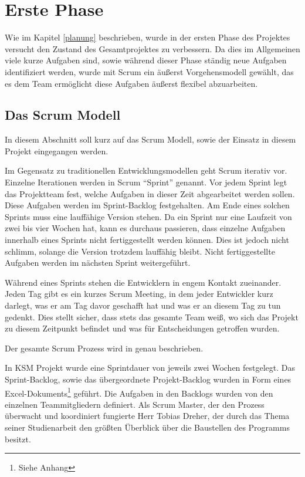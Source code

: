 \section{Erste Phase}

Wie im Kapitel \ref{planung} beschrieben, wurde in der ersten Phase des Projektes versucht den Zustand des Gesamtprojektes zu verbessern. Da dies im Allgemeinen viele kurze Aufgaben sind, sowie während dieser Phase ständig neue Aufgaben identifiziert werden, wurde mit Scrum ein äußerst Vorgehensmodell gewählt, das es dem Team ermöglicht diese Aufgaben äußerst flexibel abzuarbeiten.

\subsection{Das Scrum Modell}

In diesem Abschnitt soll kurz auf das Scrum Modell, sowie der Einsatz in diesem Projekt eingegangen werden.

Im Gegensatz zu traditionellen Entwicklungsmodellen geht Scrum iterativ vor. Einzelne Iterationen werden in Scrum ``Sprint'' genannt. Vor jedem Sprint legt das Projektteam fest, welche Aufgaben in dieser Zeit abgearbeitet werden sollen. Diese Aufgaben werden im Sprint-Backlog festgehalten. Am Ende eines solchen Sprints muss eine lauffähige Version stehen. Da ein Sprint nur eine Laufzeit von zwei bis vier Wochen hat, kann es durchaus passieren, dass einzelne Aufgaben innerhalb eines Sprints nicht fertiggestellt werden können. Dies ist jedoch nicht schlimm, solange die Version trotzdem lauffähig bleibt. Nicht fertiggestellte Aufgaben werden im nächsten Sprint  weitergeführt. 

Während eines Sprints stehen die Entwicklern in engem Kontakt zueinander. Jeden Tag gibt es ein kurzes Scrum Meeting, in dem jeder Entwickler kurz darlegt, was er am Tag davor geschafft hat und was er an diesem Tag zu tun gedenkt. Dies stellt sicher, dass stets das gesamte Team weiß, wo sich das Projekt zu diesem Zeitpunkt befindet und was für Entscheidungen getroffen wurden. 

Der gesamte Scrum Prozess wird in \cite{bib:agil} genau beschrieben.

In KSM Projekt wurde eine Sprintdauer von jeweils zwei Wochen festgelegt. Das Sprint-Backlog, sowie das übergeordnete Projekt-Backlog wurden in Form eines Excel-Dokuments\footnote{Siehe Anhang} geführt. Die Aufgaben in den Backlogs wurden von den einzelnen Teammitgliedern definiert. Als Scrum Master, der den Prozess überwacht und koordiniert fungierte Herr Tobias Dreher, der durch das Thema seiner Studienarbeit den größten Überblick über die Baustellen des Programms besitzt.

